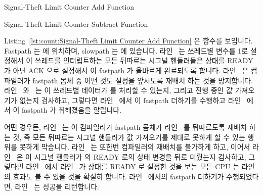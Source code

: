 \begin{listing}[tbp]

\caption{Signal-Theft Limit Counter Add Function}
\label{lst:count:Signal-Theft Limit Counter Add Function}
\end{listing}

\begin{listing}[tb]

\caption{Signal-Theft Limit Counter Subtract Function}
\label{lst:count:Signal-Theft Limit Counter Subtract Function}
\end{listing}

\begin{fcvref}
Listing~\ref{lst:count:Signal-Theft Limit Counter Add Function}
은  함수를 보입니다.
Fastpath 는  에 위치하며, slowpath 는
 에 있습니다.
라인~ 는 쓰레드별  변수를 1로 설정해서 이 쓰레드를
인터럽트하는 모든 뒤따르는 시그널 핸들러들은  상태를 READY 가 아닌
ACK 으로 설정해서 이 fastpath 가 올바르게 완료되도록 합니다.
라인~ 은 컴파일러가 fastpath 몸체 중 어떤 것도 
설정을 앞서도록 재배치 하는 것을 방지합니다.
라인~ 와~ 는 이 쓰레드별 데이터가
 를 처리할 수 있는지, 그리고 진행 중인 값 가져오기가 없는지
검사하고, 그렇다면 라인~ 에서 이 fastpath 더하기를 수행하고
라인~ 에서 이 fastpath 가 취해졌음을 알립니다.

어떤 경우든, 라인~ 는 이 컴파일러가 fastpath 몸체가
라인~ 를 뒤따르도록 재배치 하는 것, 즉 모든 뒤따르는 시그널
핸들러가 값 가져오기를 제대로 못하게 할 수 있는 행위를 못하게 막습니다.
라인~ 는 또한번 컴파일러의 재배치를 불가하게 하고, 이어서
라인~ 은 이 시그널 핸들러가  의 READY 로의 상태
변경을 뒤로 미뤘는지 검사하고, 그렇다면 라인~ 에서 라인~
가 상태를 READY 로 설정한 것을 보는 모든 CPU 는 라인~ 의 효과도 볼
수 있을 것을 확실히 합니다.
라인~ 에서의 fastpath 더하기가 수행되었다면,
라인~ 는 성공을 리턴합니다.
\end{fcvref}

